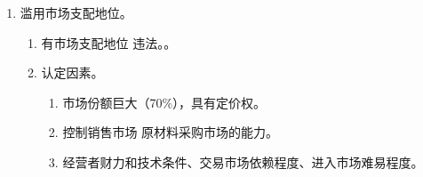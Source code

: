 \begin{enumerate}
\begin{enumerate}
\begin{enumerate}
\begin{enumerate}
                        \end{enumerate}
                  \item 纵向。经营者与交易相对人，上下游关系。更具隐蔽性。
                        \begin{enumerate}
                          \item 固定转售价格。。
                          \item 限定最低价格。。
                          \item 安全港制度。市场份额低于标准。
                        \end{enumerate}
                  \item 轴辐。大概率会考到。
                        \begin{enumerate}
                          \item 组织型。经营者不得组织其他经营者达成垄断协议。
                          \item 帮助型。经营者不得为其他经营者达成垄断协议提供实质性的帮助。
                        \end{enumerate}
                  \item 例外。不排除、限制竞争（没有坏效果）。。
                  \item 豁免。目的正当，效果积极（不是出于私心）。常识判断即可。。
                  \item 2 个新增。\yi 加倍处罚。特别严重、恶劣、严重后果。\er 对经营负责人的处罚。
                  \item 宽恕/宽大制度只针对垄断协议。
                \end{enumerate}
          \item 滥用市场支配地位。
                \begin{enumerate}
                  \item 有市场支配地位 \bdy 违法。。
                  \item 认定因素。
                        \begin{enumerate}
                          \item 市场份额巨大（70\%），具有定价权。
                          \item 控制销售市场 \hz 原材料采购市场的能力。
                          \item 经营者财力和技术条件、交易市场依赖程度、进入市场难易程度。
                        \end{enumerate}

\end{enumerate}
\end{enumerate}
\end{enumerate}
